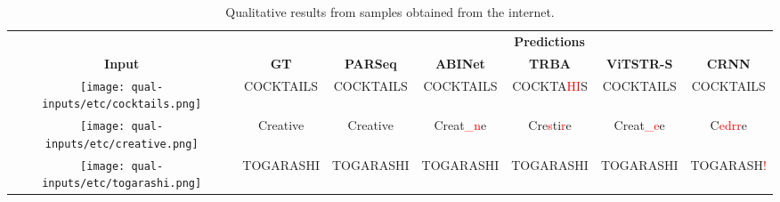 \begin{table*}[htb]
  \centering
  \tiny
  \setlength\tabcolsep{3pt}
  \caption{Qualitative results from samples obtained from the internet.}
  \begin{tabular}{ c c c c c c c }
    \toprule
    & & \multicolumn{5}{c}{\textbf{Predictions}} \\
    \cmidrule{3-7}
    \textbf{Input} & \textbf{GT} & \textbf{PARSeq} & \textbf{ABINet} & \textbf{TRBA} & \textbf{ViTSTR-S} & \textbf{CRNN} \\
    \midrule
    \texttt{[image: qual-inputs/etc/cocktails.png]} & {\tiny COCKTAILS} & {\tiny COCKTAILS} & {\tiny COCKTAILS} & {\tiny COCKTA\textcolor{red}{HI}S} & {\tiny COCKTAILS} & {\tiny COCKTAILS} \\
    \texttt{[image: qual-inputs/etc/creative.png]} & {\normalsize Creative} & {\normalsize Creative} & {\normalsize Creat\textcolor{red}{\_n}e} & {\normalsize Cre\textcolor{red}{s}ti\textcolor{red}{r}e} & {\normalsize Creat\textcolor{red}{\_e}e} & {\normalsize C\textcolor{red}{edrr}e} \\
\texttt{[image: qual-inputs/etc/togarashi.png]} & TOGARASHI & TOGARASHI & TOGARASHI & TOGARASHI & TOGARASHI & TOGARASH\textcolor{red}{!} \\
    \bottomrule
  \end{tabular}
  \label{tab:qual-results-misc}
\end{table*}
